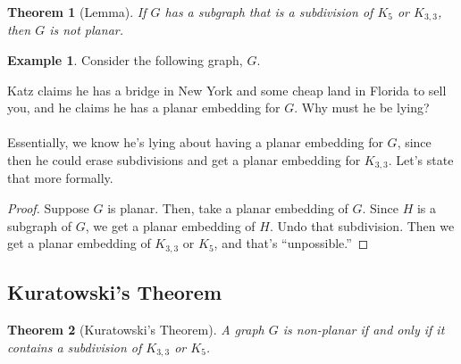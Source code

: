 \documentclass[]{article}
\newtheorem*{theorem}{Theorem}
\theoremstyle{definition}
\newtheorem{ex}{Example}[section]
\begin{document}
			\begin{theorem}[Lemma]
				If $G$ has a subgraph that is a subdivision of $K_5$ or $K_{3,3}$, then $G$ is not planar.
			\end{theorem}
			
			\begin{ex}
				Consider the following graph, $G$.
				\begin{center}
				\end{center}
				Katz claims he has a bridge in New York and some cheap land in Florida to sell you, and he claims he has a planar embedding for $G$. Why must he be lying?
				\\ \\
				Essentially, we know he's lying about having a planar embedding for $G$, since then he could erase subdivisions and get a planar embedding for $K_{3, 3}$. Let's state that more formally.
				
				\begin{proof}
					Suppose $G$ is planar. Then, take a planar embedding of $G$. Since $H$ is a subgraph of $G$, we get a planar embedding of $H$. Undo that subdivision. Then we get a planar embedding of $K_{3, 3}$ or $K_5$, and that's ``unpossible.''
				\end{proof}
			\end{ex}
			
		\subsection{Kuratowski's Theorem}
			\begin{theorem}[Kuratowski's Theorem]
				A graph $G$ is non-planar if and only if it contains a subdivision of $K_{3,3}$ or $K_5$.
			\end{theorem}
			
\end{document}
